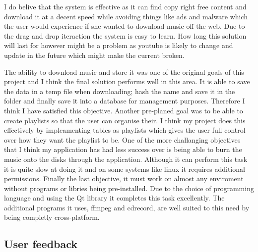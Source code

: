 \documentclass{article}
\begin{document}
I do belive that the system is effective as it can find copy right free content and download it at a decent
speed while avoiding things like ads and malware which the user would experience if she wanted to download
music off the web. Due to the drag and drop iteraction the system is easy to learn. How long this solution
will last for however might be a problem as youtube is likely to change and update in the future which
might make the current broken.

The ability to download music and store it was one of the original goals of this project and I think the
final solution performs well in this area. It is able to save the data in a temp file when downloading;
hash the name and save it in the folder and finally save it into a database for management purposes. Therefore
I think I have satisfied this objective. Another pre-planed goal was to be able to create playlists so that
the user can organise their. I think my project does this effectively by impleamenting tables as playlists
which gives the user full control over how they want the playlist to be. One of the more challanging
objectives that I think my application has had less success over is being able to burn the music
onto the disks through the application. Although it can perform this task it is quite slow at doing it
and on some systems like linux it requires additional permissions. Finally the last objective, it must
work on almost any enviroment without programs or libries being pre-installed. Due to the choice of programming
language and using the Qt library it completes this task excellently. The additional programs it uses, ffmpeg
and cdrecord, are well suited to this need by being completly cross-platform.


\subsection{User feedback}
\end{document}
